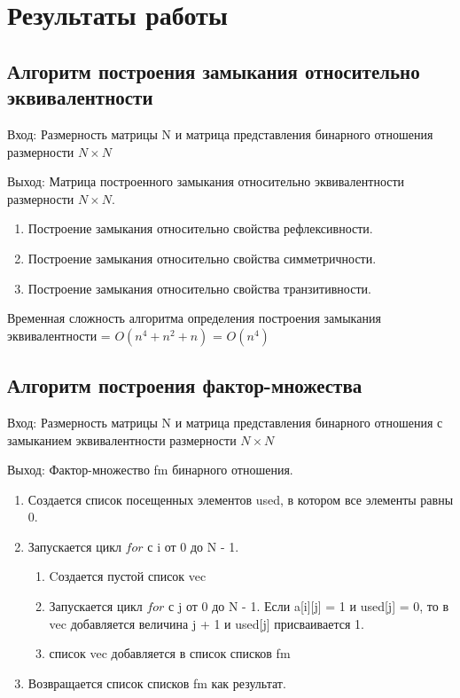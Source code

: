 \documentclass[bachelor, och, labwork]{shiza}
\begin{document}
	
	\section{Результаты работы}
	
	\subsection{Алгоритм построения замыкания относительно эквивалентности}
	
	$\textit{Вход:}$ Размерность матрицы N и матрица представления бинарного отношения размерности $N \times N$
	
	$\textit{Выход:}$  Матрица построенного замыкания относительно эквивалентности размерности $N \times N$.
	
	\begin{enumerate} 
		\item Построение замыкания относительно свойства рефлексивности.
		\item Построение замыкания относительно свойства симметричности.
		\item Построение замыкания относительно свойства транзитивности.
	\end{enumerate} 
	
	Временная сложность алгоритма определения построения замыкания эквивалентности = $O(n^4 + n^2 + n)$ = $O(n^4)$
	
		\subsection{Алгоритм построения фактор-множества}
	
	$\textit{Вход:}$ Размерность матрицы N и матрица представления бинарного отношения с замыканием эквивалентности размерности $N \times N$
	
	$\textit{Выход:}$  Фактор-множество fm бинарного отношения.
	
	\begin{enumerate} 
	\item Создается список посещенных элементов used, в котором все элементы равны 0.
	\item Запускается цикл $for$ с i от 0 до N - 1. 
		\begin{enumerate} 
			\item Cоздается пустой список vec
			\item Запускается цикл $for$ с j от 0 до N - 1. Если a[i][j] = 1 и used[j] = 0, то в vec добавляется величина j + 1 и used[j] присваивается 1.
			\item список vec добавляется в список списков fm
		\end{enumerate} 
	\item Возвращается список списков  fm как результат.
	\end{enumerate} 
	
\end{document}
